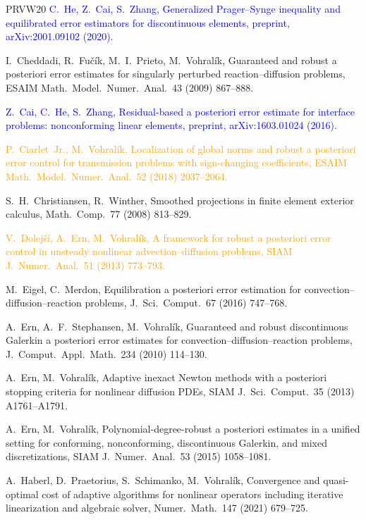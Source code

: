 \documentclass[11pt]{article}
\newcommand{\rev}[1]{\textcolor{blue}{#1}}
\newcommand{\refe}[1]{\textcolor{orange}{#1}}   %
\theoremstyle{plain}
\theoremstyle{remark}
\numberwithin{equation}{section}
\begin{document}
\begin{thebibliography}{PRVW20}
\rev{C.~He, Z.~Cai, S.~Zhang,
Generalized Prager--Synge inequality and equilibrated error estimators for discontinuous elements,
preprint, arXiv:2001.09102 (2020).}

I.~Cheddadi, R.~Fu\v{c}\'ik, M.~I.~Prieto, M.~Vohral\'ik,
Guaranteed and robust a posteriori error estimates for singularly perturbed reaction--diffusion
problems,
ESAIM Math.\ Model.\ Numer.\ Anal.\ 43 (2009) 867--888.

\rev{Z.~Cai, C.~He, S.~Zhang,
Residual-based a posteriori error estimate for interface problems: nonconforming linear elements,
preprint, arXiv:1603.01024 (2016).}

\refe{P.~Ciarlet~Jr., M.~Vohral\'ik,
Localization of global norms and robust a posteriori error control for transmission problems with
sign-changing coefficients,
ESAIM Math.\ Model.\ Numer.\ Anal.\ 52 (2018) 2037--2064.}

S.~H.~Christiansen, R.~Winther,
Smoothed projections in finite element exterior calculus,
Math.\ Comp.\ 77 (2008) 813--829.

\refe{V.~Dolej\v{s}\'i, A.~Ern, M.~Vohral\'ik,
A framework for robust a posteriori error control in unsteady nonlinear advection--diffusion problems,
SIAM J.\ Numer.\ Anal.\ 51 (2013) 773--793.}

M.~Eigel, C.~Merdon,
Equilibration a posteriori error estimation for convection--diffusion--reaction problems,
J.\ Sci.\ Comput.\ 67 (2016) 747--768.

A.~Ern, A.~F.~Stephansen, M.~Vohral\'ik,
Guaranteed and robust discontinuous Galerkin a posteriori error estimates for
convection--diffusion--reaction problems,
J.\ Comput.\ Appl.\ Math.\ 234 (2010) 114--130.

A.~Ern, M.~Vohral\'ik,
Adaptive inexact Newton methods with a posteriori stopping criteria for nonlinear diffusion PDEs,
SIAM J.\ Sci.\ Comput.\ 35 (2013) A1761--A1791.

A.~Ern, M.~Vohral\'ik,
Polynomial-degree-robust a posteriori estimates in a unified setting for conforming, nonconforming,
discontinuous Galerkin, and mixed discretizations,
SIAM J.\ Numer.\ Anal.\ 53 (2015) 1058--1081.

A.~Haberl, D.~Praetorius, S.~Schimanko, M.~Vohral\'ik,
Convergence and quasi-optimal cost of adaptive algorithms for nonlinear operators including
iterative linearization and algebraic solver,
Numer.\ Math.\ 147 (2021) 679--725.


\end{thebibliography}
\end{document}
